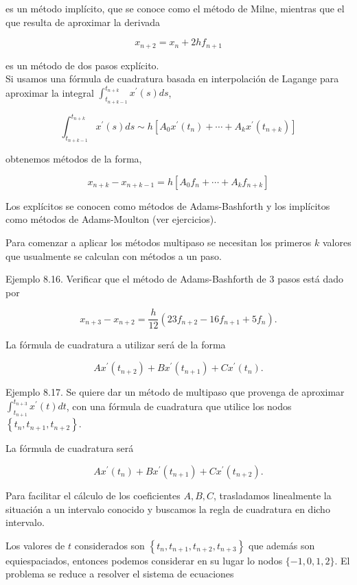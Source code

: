 \documentclass[10pt]{article}
\begin{document}
es un método implícito, que se conoce como el método de Milne, mientras que el que resulta de aproximar la derivada

$$
x_{n+2}=x_{n}+2 h f_{n+1}
$$

es un método de dos pasos explícito.\\
Si usamos una fórmula de cuadratura basada en interpolación de Lagange para aproximar la integral $\int_{t_{n+k-1}}^{t_{n+k}} x^{\prime}(s) d s$,

$$
\int_{t_{n+k-1}}^{t_{n+k}} x^{\prime}(s) d s \sim h\left[A_{0} x^{\prime}\left(t_{n}\right)+\cdots+A_{k} x^{\prime}\left(t_{n+k}\right)\right]
$$

obtenemos métodos de la forma,

$$
x_{n+k}-x_{n+k-1}=h\left[A_{0} f_{n}+\cdots+A_{k} f_{n+k}\right]
$$

Los explícitos se conocen como métodos de Adams-Bashforth y los implícitos como métodos de Adams-Moulton (ver ejercicios).

Para comenzar a aplicar los métodos multipaso se necesitan los primeros $k$ valores que usualmente se calculan con métodos a un paso.

Ejemplo 8.16. Verificar que el método de Adams-Bashforth de 3 pasos está dado por

$$
x_{n+3}-x_{n+2}=\frac{h}{12}\left(23 f_{n+2}-16 f_{n+1}+5 f_{n}\right) .
$$

La fórmula de cuadratura a utilizar será de la forma

$$
A x^{\prime}\left(t_{n+2}\right)+B x^{\prime}\left(t_{n+1}\right)+C x^{\prime}\left(t_{n}\right) .
$$

Ejemplo 8.17. Se quiere dar un método de multipaso que provenga de aproximar $\int_{t_{n+1}}^{t_{n+3}} x^{\prime}(t) d t$, con una fórmula de cuadratura que utilice los nodos $\left\{t_{n}, t_{n+1}, t_{n+2}\right\}$.

La fórmula de cuadratura será

$$
A x^{\prime}\left(t_{n}\right)+B x^{\prime}\left(t_{n+1}\right)+C x^{\prime}\left(t_{n+2}\right) .
$$

Para facilitar el cálculo de los coeficientes $A, B, C$, trasladamos linealmente la situación a un intervalo conocido y buscamos la regla de cuadratura en dicho intervalo.

Los valores de $t$ considerados son $\left\{t_{n}, t_{n+1}, t_{n+2}, t_{n+3}\right\}$ que además son equiespaciados, entonces podemos considerar en su lugar lo nodos $\{-1,0,1,2\}$. El problema se reduce a resolver el sistema de ecuaciones
\end{document}
